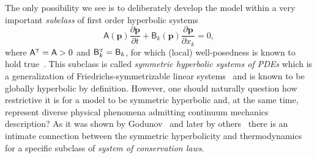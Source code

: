 \documentclass[twoside]{article}
\newcommand{\pp}{{\boldsymbol{p}}}
\newcommand{\pd}{\partial}
\newcommand{\transpose}{{\rm {\mathsmaller T}}}
\begin{document}
The only possibility we see is to deliberately 
develop the model within a very important \textit{subclass} of first order 
hyperbolic systems 
\begin{equation}\label{eq.intro.symmetric}
\mathsf{A}(\pp)\frac{\pd\pp}{\pd t} + \mathsf{B}_k(\pp)\frac{\pd\pp}{\pd x_k} 
= 0,
\end{equation}
where $ \mathsf{A}^\transpose=\mathsf{A} >0$ and $ 
\mathsf{B}_k^\transpose=\mathsf{B}_k$, for which (local) well-posedness is 
known to hold true~\cite{Kato1975,Serre2007,MullerRuggeri1998,Ruggeri2005}. 
This subclass is called  \textit{symmetric  hyperbolic  systems of PDEs} which 
is a generalization of Friedrichs-symmetrizable linear 
systems~\cite{Friedrichs1958} and is known to be globally hyperbolic by  
definition. However, one should
naturally question how restrictive it is
for a model to be symmetric hyperbolic and, at the same time, represent diverse 
physical phenomena admitting continuum mechanics description? As it was shown 
by Godunov~\cite{God1961,God1962,God1972MHD} and later by
others~\cite{FriedLax1971,Boillat1974,Ruggeri1981Euler} there is an intimate 
connection between the symmetric hyperbolicity and thermodynamics for a 
specific subclass of \textit{system of conservation laws}. 
\end{document}
